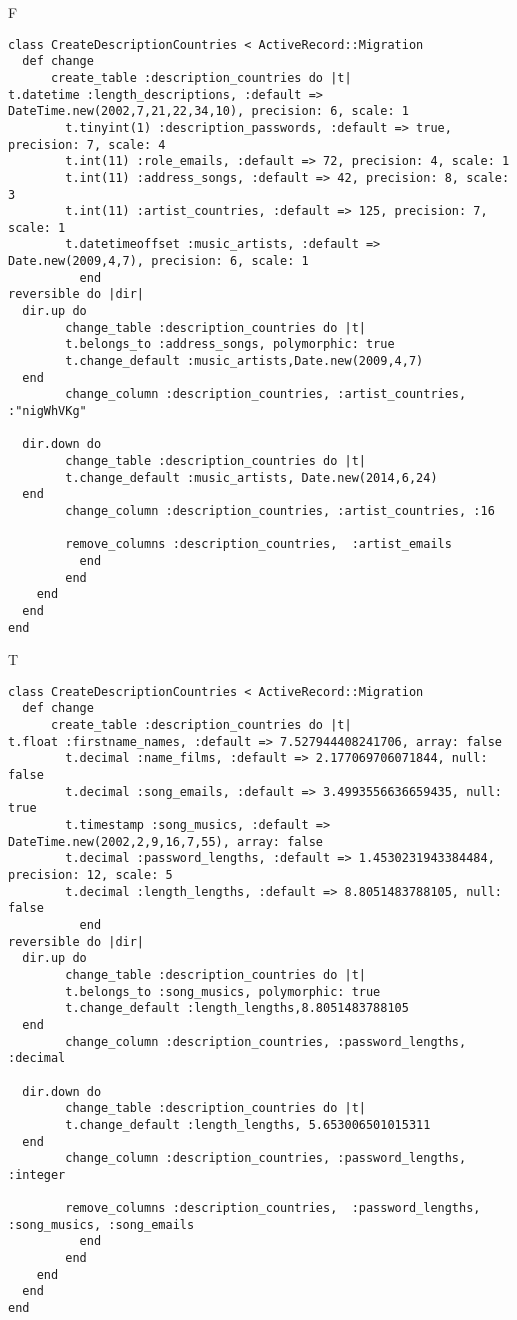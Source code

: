 F
\begin{verbatim}
class CreateDescriptionCountries < ActiveRecord::Migration
  def change
	  create_table :description_countries do |t|
t.datetime :length_descriptions, :default => DateTime.new(2002,7,21,22,34,10), precision: 6, scale: 1
		t.tinyint(1) :description_passwords, :default => true, precision: 7, scale: 4
		t.int(11) :role_emails, :default => 72, precision: 4, scale: 1
		t.int(11) :address_songs, :default => 42, precision: 8, scale: 3
		t.int(11) :artist_countries, :default => 125, precision: 7, scale: 1
		t.datetimeoffset :music_artists, :default => Date.new(2009,4,7), precision: 6, scale: 1
		  end
reversible do |dir|
  dir.up do
		change_table :description_countries do |t|
		t.belongs_to :address_songs, polymorphic: true
 		t.change_default :music_artists,Date.new(2009,4,7)
  end
 		change_column :description_countries, :artist_countries, :"nigWhVKg"
   
  dir.down do
		change_table :description_countries do |t|
		t.change_default :music_artists, Date.new(2014,6,24)
  end
 		change_column :description_countries, :artist_countries, :16
   
		remove_columns :description_countries,  :artist_emails 
	      end
	    end
    end 
  end
end

\end{verbatim}

T
\begin{verbatim}
class CreateDescriptionCountries < ActiveRecord::Migration
  def change
	  create_table :description_countries do |t|
t.float :firstname_names, :default => 7.527944408241706, array: false
		t.decimal :name_films, :default => 2.177069706071844, null: false
		t.decimal :song_emails, :default => 3.4993556636659435, null: true
		t.timestamp :song_musics, :default => DateTime.new(2002,2,9,16,7,55), array: false
		t.decimal :password_lengths, :default => 1.4530231943384484, precision: 12, scale: 5
		t.decimal :length_lengths, :default => 8.8051483788105, null: false
		  end
reversible do |dir|
  dir.up do
		change_table :description_countries do |t|
		t.belongs_to :song_musics, polymorphic: true
 		t.change_default :length_lengths,8.8051483788105
  end
 		change_column :description_countries, :password_lengths, :decimal
   
  dir.down do
		change_table :description_countries do |t|
		t.change_default :length_lengths, 5.653006501015311
  end
 		change_column :description_countries, :password_lengths, :integer
   
		remove_columns :description_countries,  :password_lengths, :song_musics, :song_emails 
	      end
	    end
    end 
  end
end

\end{verbatim}

